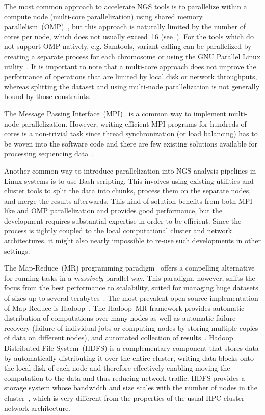 \documentclass[10pt]{article}
\begin{document}
The most common approach to accelerate NGS tools is to parallelize within a compute node (multi-core parallelization) using shared memory parallelism~(OMP)~\cite{openmp}, but this approach is naturally limited by the number of cores per node, which does not usually exceed~16 (see~\cite{top500}). For the tools which do not support OMP natively, e.g. Samtools, variant calling can be parallelized by creating a separate process for each chromosome or using the GNU Parallel Linux utility~\cite{Tange2011a}.
It is important to note that a multi-core approach does not improve the performance of operations that are limited by local disk or network throughputs, whereas splitting the dataset and using multi-node parallelization is not generally bound by those constraints.

The Message Passing Interface~(MPI)~\cite{mpi1} is a common way to implement multi-node parallelization. However, writing efficient MPI-programs for hundreds of cores is a non-trivial task since thread synchronization (or load balancing) has to be woven into the software code and there are few existing solutions available for processing sequencing data~\cite{pmap, erne, gnumap}.

Another common way to introduce parallelization into NGS analysis pipelines in Linux systems is to use Bash scripting. This involves using existing utilities and cluster tools to split the data into chunks, process them on the separate nodes, and merge the results afterwards. This kind of solution benefits from both MPI-like and OMP parallelization and provides good performance, but the development requires substantial expertise in order to be efficient. Since the process is tightly coupled to the local computational cluster and network architectures, it might also nearly impossible to re-use such developments in other settings.

The Map-Reduce~(MR) programming paradigm~\cite{dean.2004.mapreduce} offers a compelling alternative for running tasks in a {\it massively} parallel way. This paradigm, however, shifts the focus from the best performance to scalability, suited for managing huge datasets of sizes up to several terabytes~\cite{lin2010}.
The most prevalent open source implementation of Map-Reduce is Hadoop~\cite{hadoop,Hadoop:Guide}.
The Hadoop~MR framework provides automatic distribution of computations over many nodes as well as automatic failure recovery (failure of individual jobs or computing nodes by storing multiple copies of data on different nodes), and automated collection of results~\cite{Hadoop:Guide}. Hadoop Distributed File System~(HDFS) is a complementary component that stores data by automatically distributing it over the entire cluster, writing data blocks onto the local disk of each node and therefore effectively enabling moving the computation to the data and thus reducing network traffic. HDFS provides a storage system whose bandwidth and size scales with the number of nodes in the cluster~\cite{Sammer:2012}, which is very different from the properties of the usual HPC cluster network architecture.
\end{document}
